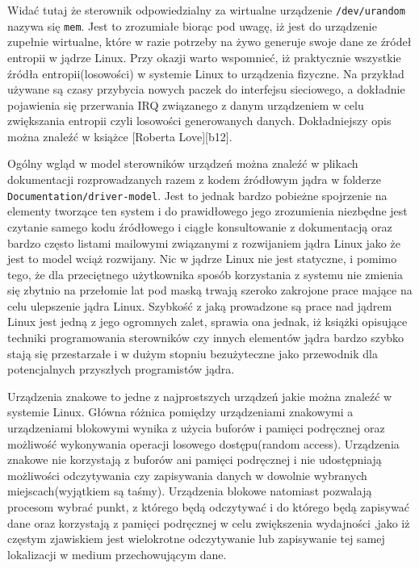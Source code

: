 Widać tutaj że sterownik odpowiedzialny za wirtualne urządzenie
\texttt{/dev/urandom} nazywa się \texttt{mem}. Jest to zrozumiałe biorąc
pod uwagę, iż jest do urządzenie zupełnie wirtualne, które w razie
potrzeby na żywo generuje swoje dane ze źródeł entropii w jądrze Linux.
Przy okazji warto wspomnieć, iż praktycznie wszystkie źródła
entropii(losowości) w systemie Linux to urządzenia fizyczne. Na przykład
używane są czasy przybycia nowych paczek do interfejsu sieciowego, a
dokładnie pojawienia się przerwania IRQ związanego z danym urządzeniem w
celu zwiększania entropii czyli losowości generowanych danych.
Dokładniejszy opis można znaleźć w książce {[}Roberta Love{]}{[}b12{]}.

Ogólny wgląd w model sterowników urządzeń można znaleźć w plikach
dokumentacji rozprowadzanych razem z kodem źródłowym jądra w folderze
\texttt{Documentation/driver-model}. Jest to jednak bardzo pobieżne
spojrzenie na elementy tworzące ten system i do prawidłowego jego
zrozumienia niezbędne jest czytanie samego kodu źródłowego i ciągłe
konsultowanie z dokumentacją oraz bardzo często listami mailowymi
związanymi z rozwijaniem jądra Linux jako że jest to model wciąż
rozwijany. Nic w jądrze Linux nie jest statyczne, i pomimo tego, że dla
przeciętnego użytkownika sposób korzystania z systemu nie zmienia się
zbytnio na przełomie lat pod maską trwają szeroko zakrojone prace mające
na celu ulepszenie jądra Linux. Szybkość z jaką prowadzone są prace nad
jądrem Linux jest jedną z jego ogromnych zalet, sprawia ona jednak, iż
książki opisujące techniki programowania sterowników czy innych
elementów jądra bardzo szybko stają się przestarzałe i w dużym stopniu
bezużyteczne jako przewodnik dla potencjalnych przyszłych programistów
jądra.


Urządzenia znakowe to jedne z najprostszych urządzeń jakie można znaleźć
w systemie Linux. Główna różnica pomiędzy urządzeniami znakowymi a
urządzeniami blokowymi wynika z użycia buforów i pamięci podręcznej oraz
możliwość wykonywania operacji losowego dostępu(random access).
Urządzenia znakowe nie korzystają z buforów ani pamięci podręcznej i nie
udostępniają możliwości odczytywania czy zapisywania danych w dowolnie
wybranych miejscach(wyjątkiem są taśmy). Urządzenia blokowe natomiast
pozwalają procesom wybrać punkt, z którego będą odczytywać i do którego
będą zapisywać dane oraz korzystają z pamięci podręcznej w celu
zwiększenia wydajności ,jako iż częstym zjawiskiem jest wielokrotne
odczytywanie lub zapisywanie tej samej lokalizacji w medium
przechowującym dane.

